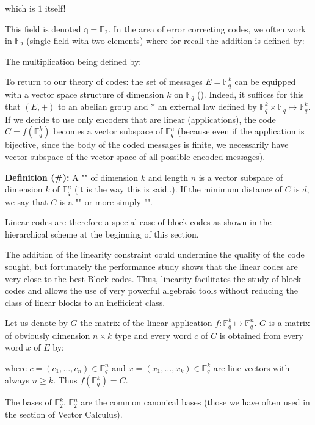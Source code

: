 	which is $1$ itself!

	This field is denoted $\mathbb{q}=\mathbb{F}_2$. In the area of error correcting codes, we often work in $\mathbb{F}_2$ (single field with two elements) where for recall the addition is defined by:
	
	The multiplication being defined by:
	
	
	To return to our theory of codes: the set of messages $E=\mathbb{F}_q^k$ can be equipped with a vector space structure of dimension $k$ on $\mathbb{F}_q$ (). Indeed, it suffices for this that $(E, +)$ to an abelian group and $*$ an external law defined by $\mathbb{F}_q^k\times \mathbb{F}_q\mapsto \mathbb{F}_q^k$. If we decide to use only encoders that are linear (applications), the code $C=f(\mathbb{F}_q^k)$ becomes a vector subspace of $\mathbb{F}_q^n$ (because even if the application is bijective, since the body of the coded messages is finite, we necessarily have vector subspace of the vector space of all possible encoded messages).
	
	\textbf{Definition (\#\mydef):} A "" of dimension $k$ and length $n$ is a vector subspace of dimension $k$ of $\mathbb{F}_q^n$ (it is the way this is said..). If the minimum distance of $C$ is $d$, we say that $C$ is a "" or more simply "".
	
	\begin{tcolorbox}[title=Remark,colframe=black,arc=10pt]
	Linear codes are therefore a special case of block codes as shown in the hierarchical scheme at the beginning of this section.
	\end{tcolorbox}
	The addition of the linearity constraint could undermine the quality of the code sought, but fortunately the performance study shows that the linear codes are very close to the best Block codes. Thus, linearity facilitates the study of block codes and allows the use of very powerful algebraic tools without reducing the class of linear blocks to an inefficient class.
	
	Let us denote by $G$ the matrix of the linear application $f:\mathbb{F}_q^k \mapsto \mathbb{F}_q^n$. $G$ is a matrix of obviously dimension $n\times k$ type and every word $c$ of $C$ is obtained from every word $x$ of $E$ by:
	
	where $c=(c_1,\ldots,c_n)\in\mathbb{F}_q^n$ and $x=(x_1,\ldots,x_k)\in\mathbb{F}_q^k$ are line vectors with always $n\ge k$. Thus $f(\mathbb{F}_q^k)=C$.
	\begin{tcolorbox}[title=Remark,colframe=black,arc=10pt]
	The bases of $\mathbb{F}_2^k$, $\mathbb{F}_2^n$ are the common canonical bases (those we have often used in the section of Vector Calculus).
	\end{tcolorbox}
	
